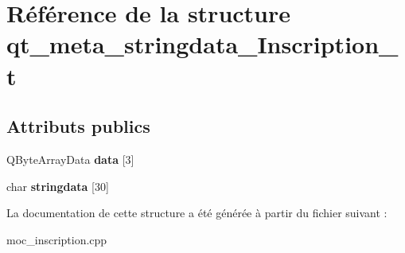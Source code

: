 \hypertarget{structqt__meta__stringdata___inscription__t}{\section{Référence de la structure qt\+\_\+meta\+\_\+stringdata\+\_\+\+Inscription\+\_\+t}
\label{structqt__meta__stringdata___inscription__t}
}
\subsection*{Attributs publics}
\begin{DoxyCompactItemize}
\item 
\hypertarget{structqt__meta__stringdata___inscription__t_aca8da12b97d183c10a5383887c330c86}{Q\+Byte\+Array\+Data {\bfseries data} \mbox{[}3\mbox{]}}\label{structqt__meta__stringdata___inscription__t_aca8da12b97d183c10a5383887c330c86}

\item 
\hypertarget{structqt__meta__stringdata___inscription__t_ac3371c007e2d62147816a92a670aec35}{char {\bfseries stringdata} \mbox{[}30\mbox{]}}\label{structqt__meta__stringdata___inscription__t_ac3371c007e2d62147816a92a670aec35}

\end{DoxyCompactItemize}


La documentation de cette structure a été générée à partir du fichier suivant \+:\begin{DoxyCompactItemize}
\item 
moc\+\_\+inscription.\+cpp\end{DoxyCompactItemize}
